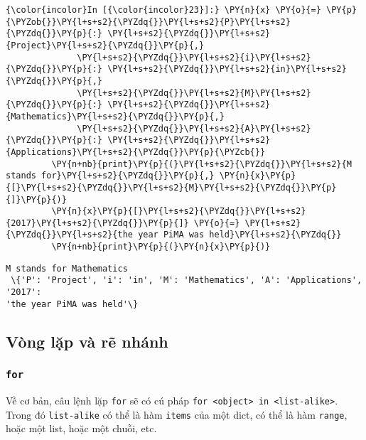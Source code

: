     
\begin{Verbatim}[commandchars=\\\{\}]
{\color{incolor}In [{\color{incolor}23}]:} \PY{n}{x} \PY{o}{=} \PY{p}{\PYZob{}}\PY{l+s+s2}{\PYZdq{}}\PY{l+s+s2}{P}\PY{l+s+s2}{\PYZdq{}}\PY{p}{:} \PY{l+s+s2}{\PYZdq{}}\PY{l+s+s2}{Project}\PY{l+s+s2}{\PYZdq{}}\PY{p}{,}
              \PY{l+s+s2}{\PYZdq{}}\PY{l+s+s2}{i}\PY{l+s+s2}{\PYZdq{}}\PY{p}{:} \PY{l+s+s2}{\PYZdq{}}\PY{l+s+s2}{in}\PY{l+s+s2}{\PYZdq{}}\PY{p}{,}
              \PY{l+s+s2}{\PYZdq{}}\PY{l+s+s2}{M}\PY{l+s+s2}{\PYZdq{}}\PY{p}{:} \PY{l+s+s2}{\PYZdq{}}\PY{l+s+s2}{Mathematics}\PY{l+s+s2}{\PYZdq{}}\PY{p}{,}
              \PY{l+s+s2}{\PYZdq{}}\PY{l+s+s2}{A}\PY{l+s+s2}{\PYZdq{}}\PY{p}{:} \PY{l+s+s2}{\PYZdq{}}\PY{l+s+s2}{Applications}\PY{l+s+s2}{\PYZdq{}}\PY{p}{\PYZcb{}}
         \PY{n+nb}{print}\PY{p}{(}\PY{l+s+s2}{\PYZdq{}}\PY{l+s+s2}{M stands for}\PY{l+s+s2}{\PYZdq{}}\PY{p}{,} \PY{n}{x}\PY{p}{[}\PY{l+s+s2}{\PYZdq{}}\PY{l+s+s2}{M}\PY{l+s+s2}{\PYZdq{}}\PY{p}{]}\PY{p}{)}
         \PY{n}{x}\PY{p}{[}\PY{l+s+s2}{\PYZdq{}}\PY{l+s+s2}{2017}\PY{l+s+s2}{\PYZdq{}}\PY{p}{]} \PY{o}{=} \PY{l+s+s2}{\PYZdq{}}\PY{l+s+s2}{the year PiMA was held}\PY{l+s+s2}{\PYZdq{}}
         \PY{n+nb}{print}\PY{p}{(}\PY{n}{x}\PY{p}{)}
\end{Verbatim}
    

    \begin{Verbatim}[commandchars=\\\{\}]
M stands for Mathematics
 \{'P': 'Project', 'i': 'in', 'M': 'Mathematics', 'A': 'Applications', '2017':
'the year PiMA was held'\}

    \end{Verbatim}

    \subsection{Vòng lặp và rẽ
nhánh}\label{vuxf2ng-lux1eb7p-vuxe0-rux1ebd-nhuxe1nh}

\subsubsection{\texorpdfstring{\texttt{for}}{for}}\label{for}

Về cơ bản, câu lệnh lặp \texttt{for} sẽ có cú pháp
\texttt{for\ \textless{}object\textgreater{}\ in\ \textless{}list-alike\textgreater{}}.
Trong đó \texttt{list-alike} có thể là hàm \texttt{items} của một dict,
có thể là hàm \texttt{range}, hoặc một list, hoặc một chuỗi, etc.

